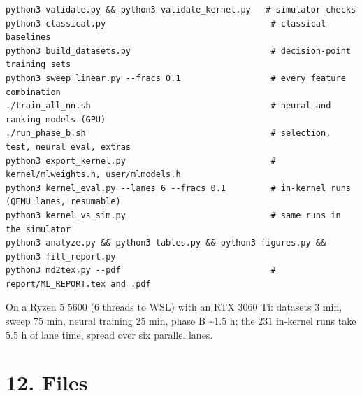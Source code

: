 \documentclass[10pt,a4paper]{article}
\begin{document}
\begin{Verbatim}[fontsize=\scriptsize,xleftmargin=1em]
python3 validate.py && python3 validate_kernel.py   # simulator checks
python3 classical.py                                 # classical baselines
python3 build_datasets.py                            # decision-point training sets
python3 sweep_linear.py --fracs 0.1                  # every feature combination
./train_all_nn.sh                                    # neural and ranking models (GPU)
./run_phase_b.sh                                     # selection, test, neural eval, extras
python3 export_kernel.py                             # kernel/mlweights.h, user/mlmodels.h
python3 kernel_eval.py --lanes 6 --fracs 0.1         # in-kernel runs (QEMU lanes, resumable)
python3 kernel_vs_sim.py                             # same runs in the simulator
python3 analyze.py && python3 tables.py && python3 figures.py && python3 fill_report.py
python3 md2tex.py --pdf                              # report/ML_REPORT.tex and .pdf
\end{Verbatim}

On a Ryzen 5 5600 (6 threads to WSL) with an RTX 3060 Ti: datasets 3 min, sweep 75 min, neural training 25 min, phase B \textasciitilde{}1.5 h; the 231 in-kernel runs take 5.5 h of lane time, spread over six parallel lanes.

\section*{12. Files}
\end{document}

